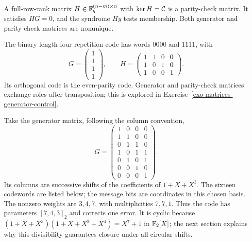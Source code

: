 \begin{rem}
\label{rmk-matrices-control}
A full-row-rank matrix $H\in\mathbb{F}_q^{(n-m)\times n}$ with $\ker H=\mathcal{C}$
is a parity-check matrix. It satisfies $HG=0$, and the syndrome $Hy$
tests membership. Both generator and parity-check matrices are nonunique.
\end{rem}


\begin{exmp}[Repetition]
The binary length-four repetition code has words $0000$ and $1111$, with
\[
 G=\begin{pmatrix}1\\1\\1\\1\end{pmatrix},\qquad
 H=\begin{pmatrix}1&1&0&0\\1&0&1&0\\1&0&0&1\end{pmatrix}.
\]
Its orthogonal code is the even-parity code. Generator and parity-check
matrices exchange roles after transposition; this is explored in
Exercise~\ref{exo-matrices-generator-control}.
\end{exmp}


\begin{exmp}
\label{exmp-code-hamming-7}
Take the generator matrix, following the column convention,
\[
 G=\begin{pmatrix}
 1&0&0&0\\1&1&0&0\\0&1&1&0\\1&0&1&1\\0&1&0&1\\0&0&1&0\\0&0&0&1
 \end{pmatrix}.
\]
Its columns are successive shifts of the coefficients of $1+X+X^3$.
The sixteen codewords are listed below; the message bits are coordinates
in this chosen basis.
\[

\]
The nonzero weights are $3,4,7$, with multiplicities $7,7,1$.
Thus the code has parameters $[7,4,3]_2$ and corrects one error.
It is cyclic because
$(1+X+X^3)(1+X+X^2+X^4)=X^7+1$ in $\mathbb{F}_2[X]$; the next section
explains why this divisibility guarantees closure under all circular shifts.
\end{exmp}

